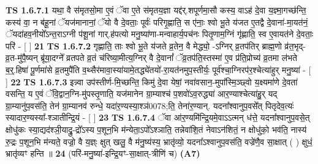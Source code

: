 \documentclass[17pt]{extarticle}
\begin{document}
                                        \textbf{ TS 1.6.7.1} \newline
                  यथा॒ वै स॑मृतसो॒मा ए॒वं ॅवा ए॒ते स॑मृतय॒ज्ञा यद्द॑र्.शपूर्णमा॒सौ कस्य॒ वाऽह॑ दे॒वा य॒ज्ञ्मा॒गच्छ॑न्ति॒ कस्य॑ वा॒ न ब॑हू॒नां ॅयज॑मानानां॒ ॅयो वै दे॒वताः॒ पूर्वः॑ परिगृ॒ह्णाति॒ स ए॑नाः॒ श्वो भू॒ते य॑जत ए॒तद्वै दे॒वाना॑-मा॒यत॑नं॒ ॅयदा॑हव॒नीयो᳚ऽन्त॒राऽग्नी प॑शू॒नां गार्.ह॑पत्यो मनु॒ष्या॑णा-मन्वाहार्य॒पच॑नः पितृ॒णाम॒ग्निं गृ॑ह्णाति॒ स्व ए॒वायत॑ने दे॒वताः॒ परि॑ - [ ] \textbf{  21} \newline
                  \newline
                                \textbf{ TS 1.6.7.2} \newline
                  गृह्णाति॒ ताः श्वो भू॒ते य॑जते व्र॒तेन॒ वै मेद्ध्यो॒ -ऽग्निर् व्र॒तप॑तिर् ब्राह्म॒णो व्र॑त॒भृद्-व्र॒त-मु॑पै॒ष्यन् ब्रू॑या॒दग्ने᳚ व्रतपते व्र॒तं च॑रिष्या॒मीत्य॒ग्निर् वै दे॒वानां᳚ ॅव्र॒तप॑ति॒स्तस्मा॑ ए॒व प्र॑ति॒प्रोच्य॑ व्र॒तमा ल॑भते ब॒र्॒.हिषा॑ पू॒र्णमा॑से व्र॒तमुपै॑ति व॒थ्सैर॑मावा॒स्या॑यामे॒तद्ध्ये॑तयो॑-रा॒यत॑नमुप॒स्तीर्यः॒ पूर्व॑श्चा॒ग्निरप॑र॒श्चेत्या॑हुर् मनु॒ष्या॑ - [ ] \textbf{  22} \newline
                  \newline
                                \textbf{ TS 1.6.7.3} \newline
                  इन्न्वा उप॑स्तीर्ण-मि॒च्छन्ति॒ किमु॑ दे॒वा येषां॒ नवा॑वसान॒-मुपा᳚स्मि॒ञ्छ्वो य॒क्ष्यमा॑णे दे॒वता॑ वसन्ति॒ य ए॒वं ॅवि॒द्वान॒ग्नि-मु॑पस्तृ॒णाति॒ यज॑मानेन ग्रा॒म्याश्च॑ प॒शवो॑ऽव॒रुद्ध्या॑ आर॒ण्याश्चेत्या॑हु॒र् यद् ग्रा॒म्यानु॑प॒वस॑ति॒ तेन॑ ग्रा॒म्यानव॑ रुन्धे॒ यदा॑र॒ण्यस्या॒श्ञ॑0078;ति॒ तेना॑र॒ण्यान्. यदना᳚श्वानुप॒वसे᳚त् पितृदेव॒त्यः॑ स्यादार॒ण्यस्या᳚-श्ञातीन्द्रि॒यं - [ ] \textbf{  23} \newline
                  \newline
                                \textbf{ TS 1.6.7.4} \newline
                  ॅवा आ॑र॒ण्यमि॑न्द्रि॒यमे॒वाऽऽत्मन् ध॑त्ते॒ यदना᳚श्वानुप॒वसे॒त् क्षोधु॑कः स्या॒द्यद॑श्ञी॒याद्रु॒-द्रो᳚ऽस्य प॒शून॒भि म॑न्येता॒ऽपो᳚ऽश्ञाति॒ तन्नेवा॑शि॒तं नेवाऽन॑शितं॒ न क्षोधु॑को॒ भव॑ति॒ नास्य॑ रु॒द्रः प॒शून॒भि म॑न्यते॒ वज्रो॒ वै य॒ज्ञ्ः क्षुत् खलु॒ वै म॑नु॒ष्य॑स्य॒ भ्रातृ॑व्यो॒ यदना᳚ऽश्वानुप॒वस॑ति॒ वज्रे॑णै॒व सा॒क्षात् ( ) क्षुधं॒ भ्रातृ॑व्यꣳ हन्ति ॥ \textbf{  24} \newline
                  \newline
                      (परि॑-मनु॒ष्या॑-इन्द्रि॒यꣳ-सा॒क्षात्-त्रीणि॑ च)  \textbf{(A7)} \newline \newline
\end{document}
